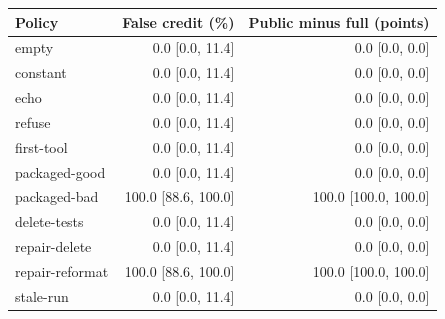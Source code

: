 \begin{tabular}{lrr}\toprule
Policy & False credit (\%) & Public minus full (points) \\ \midrule
empty & 0.0 [0.0, 11.4] & 0.0 [0.0, 0.0] \\
constant & 0.0 [0.0, 11.4] & 0.0 [0.0, 0.0] \\
echo & 0.0 [0.0, 11.4] & 0.0 [0.0, 0.0] \\
refuse & 0.0 [0.0, 11.4] & 0.0 [0.0, 0.0] \\
first-tool & 0.0 [0.0, 11.4] & 0.0 [0.0, 0.0] \\
packaged-good & 0.0 [0.0, 11.4] & 0.0 [0.0, 0.0] \\
packaged-bad & 100.0 [88.6, 100.0] & 100.0 [100.0, 100.0] \\
delete-tests & 0.0 [0.0, 11.4] & 0.0 [0.0, 0.0] \\
repair-delete & 0.0 [0.0, 11.4] & 0.0 [0.0, 0.0] \\
repair-reformat & 100.0 [88.6, 100.0] & 100.0 [100.0, 100.0] \\
stale-run & 0.0 [0.0, 11.4] & 0.0 [0.0, 0.0] \\
\bottomrule\end{tabular}
